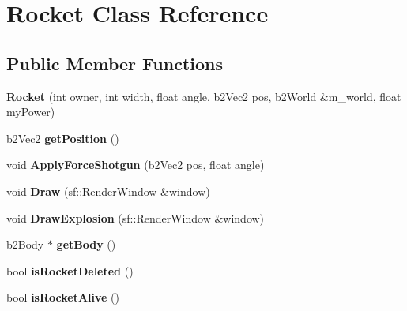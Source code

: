 \hypertarget{class_rocket}{}\section{Rocket Class Reference}
\label{class_rocket}
\subsection*{Public Member Functions}
\begin{DoxyCompactItemize}
\item 
{\bfseries Rocket} (int owner, int width, float angle, b2\+Vec2 pos, b2\+World \&m\+\_\+world, float my\+Power)\hypertarget{class_rocket_acb715e7c20b809101d1ca21ecca6221f}{}\label{class_rocket_acb715e7c20b809101d1ca21ecca6221f}

\item 
b2\+Vec2 {\bfseries get\+Position} ()\hypertarget{class_rocket_a6f66ddd6b4dc7bbed191a153a7a7a4d2}{}\label{class_rocket_a6f66ddd6b4dc7bbed191a153a7a7a4d2}

\item 
void {\bfseries Apply\+Force\+Shotgun} (b2\+Vec2 pos, float angle)\hypertarget{class_rocket_ae34c4ffd5fc0ea0d01cac21b596f06ff}{}\label{class_rocket_ae34c4ffd5fc0ea0d01cac21b596f06ff}

\item 
void {\bfseries Draw} (sf\+::\+Render\+Window \&window)\hypertarget{class_rocket_a9eceb6c7b23192dccaf30f5f85037678}{}\label{class_rocket_a9eceb6c7b23192dccaf30f5f85037678}

\item 
void {\bfseries Draw\+Explosion} (sf\+::\+Render\+Window \&window)\hypertarget{class_rocket_ac98e8092be28f010cd71ee11c9d32485}{}\label{class_rocket_ac98e8092be28f010cd71ee11c9d32485}

\item 
b2\+Body $\ast$ {\bfseries get\+Body} ()\hypertarget{class_rocket_a8fcd3f7a2ed1bc0525ed5e9e6aa04e6b}{}\label{class_rocket_a8fcd3f7a2ed1bc0525ed5e9e6aa04e6b}

\item 
bool {\bfseries is\+Rocket\+Deleted} ()\hypertarget{class_rocket_a38adbaf569bbc4f6339d8e9b28874c71}{}\label{class_rocket_a38adbaf569bbc4f6339d8e9b28874c71}

\item 
bool {\bfseries is\+Rocket\+Alive} ()\hypertarget{class_rocket_ac36714c8a8e9c078224735928f95f926}{}\label{class_rocket_ac36714c8a8e9c078224735928f95f926}

\end{DoxyCompactItemize}
